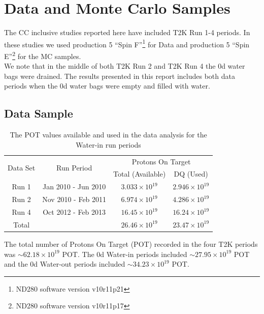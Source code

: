 \section{Data and Monte Carlo Samples}
\label{sec:Files}

The CC inclusive studies reported here have included T2K Run 1-4 periods.  
In these studies we used 
production 5 ``Spin F''\footnote{ND280 software version v10r11p21} for Data and
production 5 ``Spin E''\footnote{ND280 software version v10r11p17} for the MC
samples. \\

We note that in the middle of both T2K Run 2 and T2K Run 4 
the \p0d water bags were drained.  
The results  presented in this report includes both 
data periods when the \p0d water bags were empty and filled with water.  

\subsection{Data Sample} 

\begin{table}[h]
\centering
\begin{tabular}{cccc}\toprule
\multirow{2}{*}{Data Set} & \multirow{2}{*}{Run Period} & \multicolumn{2}{c}{Protons On Target}\\
 & & Total (Available) & DQ (Used) \\
\hline
Run 1 & Jan 2010 - Jun 2010 & $3.033\times 10^{19}$ & $2.946 \times 10^{19}$\\ 
Run 2 & Nov 2010 - Feb 2011 & $6.974\times 10^{19}$ & $4.286 \times 10^{19}$\\ 
Run 4 & Oct 2012 - Feb 2013 & $16.45\times 10^{19}$ & $16.24 \times 10^{19}$\\ 
\hline
Total &  & $26.46 \times 10^{19}$ & $23.47 \times 10^{19}$ \\ 
\bottomrule
\end{tabular} 
\caption{The POT values available and used in the data analysis for 
the Water-in run periods}
\label{tab:DataSamplesRun1Run2Run4} %
\end{table}

The total number of Protons On Target (POT) recorded in the four T2K periods 
was $\sim62.18\times 10^{19}$ POT. 
The \p0d Water-in periods included $\sim 27.95\times 10^{19}$ POT and
the \p0d Water-out periods included $\sim 34.23\times 10^{19}$ POT. \\

